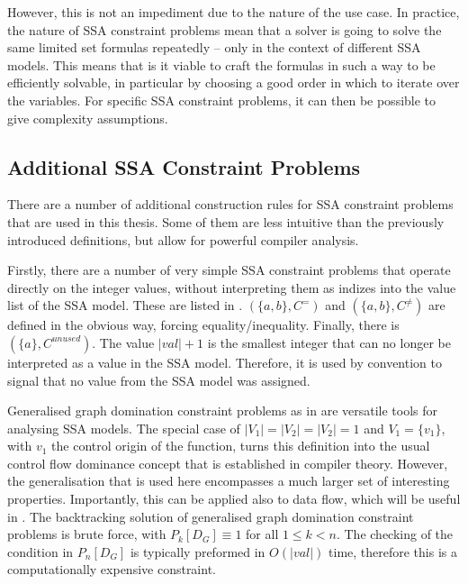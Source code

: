     However, this is not an impediment due to the nature of the use case.
    In practice, the nature of SSA constraint problems mean that a solver is
    going to solve the same limited set formulas repeatedly -- only in the
    context of different SSA models.
    This means that is it viable to craft the formulas in such a way to be
    efficiently solvable, in particular by choosing a good order in which to
    iterate over the variables.
    For specific SSA constraint problems, it can then be possible to give
    complexity assumptions.

\subsection{Additional SSA Constraint Problems}

    There are a number of additional construction rules for SSA constraint
    problems that are used in this thesis.
    Some of them are less intuitive than the previously introduced definitions,
    but allow for powerful compiler analysis.

    Firstly, there are a number of very simple SSA constraint problems that
    operate directly on the integer values, without interpreting them as indizes
    into the value list of the SSA model.
    These are listed in .
    $(\{a,b\}, C^=)$ and $(\{a,b\}, C^{\neq})$ are defined in the
    obvious way, forcing equality/inequality.
    Finally, there is $(\{a\}, C^{unused})$.
    The value $|val|+1$ is the smallest integer that can no longer be
    interpreted as a value in the SSA model.
    Therefore, it is used by convention to signal that no value from the SSA
    model was assigned.

    Generalised graph domination constraint problems as in 
    are versatile tools for analysing SSA models.
    The special case of $|V_1|=|V_2|=|V_2|=1$ and $V_1=\{v_1\}$,
    with $v_1$ the control origin of the function, turns this definition into
    the usual control flow dominance concept that is established in compiler
    theory.
    However, the generalisation that is used here encompasses a much larger
    set of interesting properties.
    Importantly, this can be applied also to data flow, which will be useful in
    .
    The backtracking solution of generalised graph domination constraint
    problems is brute force, with $P_k[D_G]\equiv 1$ for all $1\leq k<n$.
    The checking of the condition in $P_n[D_G]$ is typically preformed in
    $O(|val|)$ time, therefore this is a computationally expensive constraint.

